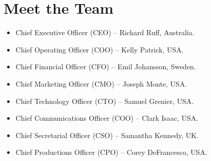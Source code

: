\documentclass[12pt,a4paper]{article}
\begin{document}
  \section*{Meet the Team}
  \begin{itemize}
    \item{Chief Executive Officer (CEO) – Richard Ruff, Australia.}
    \item{Chief Operating Officer (COO) – Kelly Patrick, USA.}
    \item{Chief Financial Officer (CFO) – Emil Johansson, Sweden.}
    \item{Chief Marketing Officer (CMO) – Joseph Monte, USA.}
    \item{Chief Technology Officer (CTO) – Samuel Grenier, USA.}
    \item{Chief Communications Officer (COO) – Clark Isaac, USA.}
    \item{Chief Secretarial Officer (CSO) – Samantha Kennedy, UK.}
    \item{Chief Productions Officer (CPO) – Corey DeFrancesco, USA.}
  \end{itemize}
  \printbibliography{}
\end{document}
